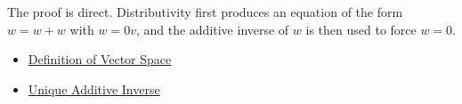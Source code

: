 \begin{remark*}
The proof is direct. Distributivity first produces an equation of the form $w=w+w$ with $w=0v$, and the additive inverse of $w$ is then used to force $w=0$.
\end{remark*}

\begin{remark*}[Dependencies]
\hfill
\begin{itemize}
  \item \hyperref[def:vector-space]{Definition of Vector Space}
  \item \hyperref[thm:unique-additive-inverse]{Unique Additive Inverse}
\end{itemize}
\end{remark*}